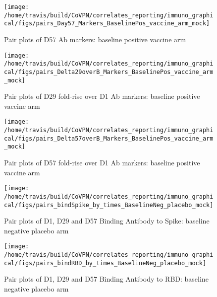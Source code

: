 \documentclass[]{book}
\theoremstyle{definition}
\theoremstyle{definition}
\theoremstyle{definition}
\newcommand{\1}{\mathbbm{1}}
\begin{document}
\begin{figure}[H]

{\centering \texttt{[image: /home/travis/build/CoVPN/correlates\_reporting/immuno\_graphical/figs/pairs\_Day57\_Markers\_BaselinePos\_vaccine\_arm\_mock]} 

}

\caption{Pair plots of D57 Ab markers: baseline positive vaccine arm}\label{fig:unnamed-chunk-14}
\end{figure}

\begin{figure}[H]

{\centering \texttt{[image: /home/travis/build/CoVPN/correlates\_reporting/immuno\_graphical/figs/pairs\_Delta29overB\_Markers\_BaselinePos\_vaccine\_arm\_mock]} 

}

\caption{Pair plots of D29 fold-rise over D1 Ab markers: baseline positive vaccine arm}\label{fig:unnamed-chunk-15}
\end{figure}

\begin{figure}[H]

{\centering \texttt{[image: /home/travis/build/CoVPN/correlates\_reporting/immuno\_graphical/figs/pairs\_Delta57overB\_Markers\_BaselinePos\_vaccine\_arm\_mock]} 

}

\caption{Pair plots of D57 fold-rise over D1 Ab markers: baseline positive vaccine arm}\label{fig:unnamed-chunk-16}
\end{figure}

\begin{figure}[H]

{\centering \texttt{[image: /home/travis/build/CoVPN/correlates\_reporting/immuno\_graphical/figs/pairs\_bindSpike\_by\_times\_BaselineNeg\_placebo\_mock]} 

}

\caption{Pair plots of D1, D29 and D57 Binding Antibody to Spike: baseline negative placebo arm}\label{fig:unnamed-chunk-17}
\end{figure}

\begin{figure}[H]

{\centering \texttt{[image: /home/travis/build/CoVPN/correlates\_reporting/immuno\_graphical/figs/pairs\_bindRBD\_by\_times\_BaselineNeg\_placebo\_mock]} 

}

\caption{Pair plots of D1, D29 and D57 Binding Antibody to RBD: baseline negative placebo arm}\label{fig:unnamed-chunk-18}
\end{figure}
\end{document}

